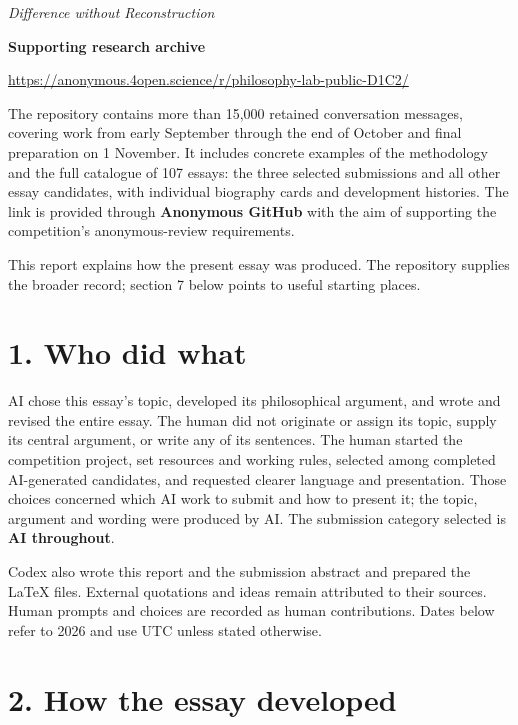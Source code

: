 
\emph{Difference without Reconstruction}

\noindent\colorbox{black!4}{\begin{minipage}{\dimexpr\linewidth-2\fboxsep\relax}
{\bfseries Supporting research archive}\par\smallskip

\url{https://anonymous.4open.science/r/philosophy-lab-public-D1C2/}

The repository contains more than 15,000 retained conversation messages, covering work from early September through the end of October and final preparation on 1 November. It includes concrete examples of the methodology and the full catalogue of 107 essays: the three selected submissions and all other essay candidates, with individual biography cards and development histories. The link is provided through \textbf{Anonymous GitHub} with the aim of supporting the competition's anonymous-review requirements.

This report explains how the present essay was produced. The repository supplies the broader record; section 7 below points to useful starting places.

\end{minipage}}\par\medskip
\section*{1. Who did what}

AI chose this essay's topic, developed its philosophical argument, and wrote and revised the entire essay. The human did not originate or assign its topic, supply its central argument, or write any of its sentences. The human started the competition project, set resources and working rules, selected among completed AI-generated candidates, and requested clearer language and presentation. Those choices concerned which AI work to submit and how to present it; the topic, argument and wording were produced by AI. The submission category selected is \textbf{AI throughout}.

Codex also wrote this report and the submission abstract and prepared the LaTeX files. External quotations and ideas remain attributed to their sources. Human prompts and choices are recorded as human contributions. Dates below refer to 2026 and use UTC unless stated otherwise.

\section*{2. How the essay developed}

